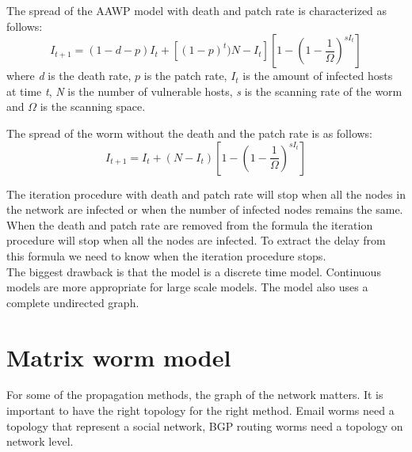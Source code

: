 The spread of the AAWP model with death and patch rate is characterized as follows:
\begin{equation}
I_{t+1}=(1-d-p)I_{t}+[(1-p)^{t})N-I_{t}][1-(1-\dfrac{1}{\Omega})^{sI_{t}}]
\end{equation}
where \textit{d} is the death rate, $p$ is the patch rate, $I_{t}$ is the amount of infected hosts at time \textit{t}, \textit{N} is the number of vulnerable hosts, \textit{s} is
the scanning rate of the worm and $\Omega$ is the scanning
space. \\ 

The spread of the worm without the death and the patch rate is as follows:
\begin{equation}
I_{t+1}=I_{t}+(N-I_{t})[1-(1-\dfrac{1}{\Omega})^{sI_{t}}]
\end{equation}

The iteration procedure with death and patch rate will stop when all the nodes in the network are infected or when the number of infected nodes remains the same. When the death and patch rate are removed from the formula the iteration procedure will stop when all the nodes are infected. To extract the delay from this formula we need to know when the iteration procedure stops. \\
The biggest drawback is that the model is a discrete time model. Continuous models are more appropriate for large scale models. The model also uses a complete undirected graph.






\section{Matrix worm model}
\label{eigenmatrixmethode}
For some of the propagation methods, the graph of the network matters. It is important to have the right topology for the right method. Email worms need a topology that represent a social network, BGP routing worms need a topology on network level. \\

